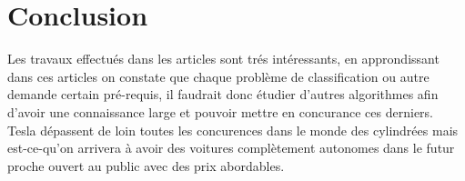 \documentclass[french,a4paper,11pt,oneside]{article}
\begin{document}
	\section{Conclusion}{
		Les travaux effectués dans les articles sont trés intéressants, en approndissant dans ces articles on constate que chaque problème de classification ou autre demande certain pré-requis, il faudrait donc étudier d'autres algorithmes afin d'avoir une connaissance large et pouvoir mettre en concurance ces derniers.\\
		Tesla dépassent de loin toutes les concurences dans le monde des cylindrées mais est-ce-qu'on arrivera à avoir des voitures complètement autonomes dans le futur proche ouvert au public avec des prix abordables.
	}
  
\end{document}
